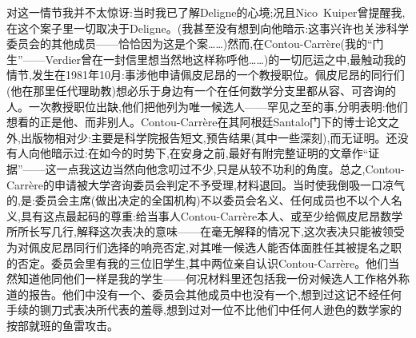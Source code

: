 对这一情节我并不太惊讶:当时我已了解Deligne的心境;况且Nico~Kuiper曾提醒我,在这个案子里一切取决于Deligne。(我甚至没有想到向他暗示:这事兴许也关涉科学委员会的其他成员——恰恰因为这是个案……)然而,在Contou-Carrère(我的“门生”——Verdier曾在一封信里想当然地这样称呼他……)的一切厄运之中,最触动我的情节,发生在1981年10月:事涉他申请佩皮尼昂的一个教授职位。佩皮尼昂的同行们(他在那里任代理助教)想必乐于身边有一个在任何数学分支里都从容、可咨询的人。一次教授职位出缺,他们把他列为唯一候选人——罕见之至的事,分明表明:他们想看的正是他、而非别人。Contou-Carrère在其阿根廷Santalo门下的博士论文之外,出版物相对少:主要是科学院报告短文,预告结果(其中一些深刻),而无证明。还没有人向他暗示过:在如今的时势下,在安身之前,最好有附完整证明的文章作“证据”——这一点我这边当然向他念叨过不少,只是从较不功利的角度。总之,Contou-Carrère的申请\dmark{}被大学咨询委员会判定不予受理,材料退回。当时使我倒吸一口凉气的,是:委员会主席(做出决定的全国机构)不以委员会名义、任何成员也不以个人名义,具有这点最起码的尊重:给当事人Contou-Carrère本人、或至少给佩皮尼昂数学所所长写几行,解释这次表决的意味——在毫无解释的情况下,这次表决只能被领受为对佩皮尼昂同行们选择的响亮否定,对其唯一候选人能否体面胜任其被提名之职的否定。委员会里有我的三位旧学生,其中两位亲自认识Contou-Carrère。他们当然知道他同他们一样是我的学生——何况材料里还包括我一份对候选人工作格外称道的报告。他们中没有一个、委员会其他成员中也没有一个,想到过这记不经任何手续的铡刀式表决所代表的羞辱,想到过对一位不比他们中任何人逊色的数学家的按部就班的鱼雷攻击。

